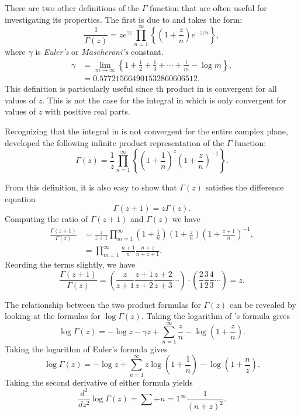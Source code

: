 There are two other definitions of the $\Gamma$ function that are
often useful for investigating its properties.  The first is due to
{\Weierstrass}
\cite{Weierstrass1856-rl} and
takes the form:
\begin{equation} \label{GammaWeierDef:Eq}
\frac{1}{\Gamma(z)} = z e^{\gamma z} \prod_{n=1}^{\infty} \left\{\left(1+
\frac{z}{n}\right)e^{-z/n}\right\},
\end{equation}
where $\gamma$ is {\em Euler's} or {\em Mascheroni's} constant.
\[
\begin{aligned}
\gamma & = \displaystyle \lim_{m\rightarrow\infty} \left\{1 + \frac{1}{2} +
\frac{1}{3} + \cdots + \frac{1}{m} - \log m\right\}, \\
 & = 0.577215664901532860606512.
\end{aligned}
\]
This definition is particularly useful since th product in
 is convergent for all values of $z$.  This
is not the case for the integral in  which
is only convergent for values of $z$ with positive real parts.

Recognizing that the integral in  is not
convergent for the entire complex plane, {\Euler} developed the
following infinite product representation of the $\Gamma$
function: 
\begin{equation} \label{GammaEulerDef:Eq}
\Gamma(z) = \frac{1}{z} \prod_{n=1}^{\infty} \left\{ \left( 1 +
\frac{1}{n}\right)^z \left(1 +  \frac{z}{n}\right)^{-1}\right\}.
\end{equation}

From this definition, it is also easy to show that $\Gamma(z)$
satisfies the difference equation
\[
\Gamma(z+1) = z \Gamma(z).
\]
Computing the ratio of $\Gamma(z+1)$ and $\Gamma(z)$ we have
\[
\begin{aligned}
\displaystyle \frac{\Gamma(z+1)}{\Gamma(z)} &
\displaystyle = \frac{z}{z+1} \prod_{m=1}^{\infty}
\left(1 + \frac{1}{n}\right) \left(1 + \frac{z}{n}\right)
\left(1 + \frac{z+1}{n}\right)^{-1}, \\
& \displaystyle = 
\prod_{m=1}^{\infty} \frac{n+1}{n} \frac{n+z}{n+z+1}.
\end{aligned}
\]
Reording the terms slightly, we have
\[
\frac{\Gamma(z+1)}{\Gamma(z)} = 
\left( \frac{z}{z+1} \frac{z+1}{z+2} \frac{z+2}{z+3} \cdots\right)
\cdot
\left(\frac{2}{1} \frac{3}{2} \frac{4}{3} \cdots \right) = z.
\]

The relationship between the two product formulas for $\Gamma(z)$ can
be revealed by looking at the formulas for $\log \Gamma(z)$.  Taking
the logarithm of {\Weierstrass}'s formula 
gives
\[
\log \Gamma(z) = 
- \log z - \gamma z + \sum_{n=1}^{\infty} \frac{z}{n} - \log \left(1 + \frac{z}{n}\right).
\]
Taking the logarithm of Euler's formula 
gives
\[
\log \Gamma(z) = - \log z + \sum_{n=1}^{\infty} z \log \left(1+
\frac{1}{n}\right) - \log \left( 1 + \frac{n}{z}\right).
\]
Taking the second derivative of either formula yields
\[
\frac{d^2}{dz^2} \log \Gamma(z) = \sum+{n=1}^{\infty}
\frac{1}{(n+z)^2}.
\]

